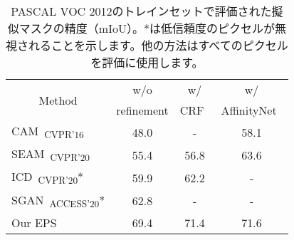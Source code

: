 \begin{table}[]
\centering
{\small
\begin{tabular}{@{}lccc@{}}
\toprule
\multicolumn{1}{c}{\multirow{2}{*}{Method}}         & w/o           & w/ &                                  w/ \\
                                                    & refinement    & CRF~\cite{krahenbuhl2011efficient}    & AffinityNet~\cite{ahn2018learning}    \\ \midrule
\multicolumn{1}{l}{CAM~\cite{zhou2016learning}\textsubscript{CVPR'16}}     & 48.0          & -                                     & 58.1                                  \\
\multicolumn{1}{l}{SEAM~\cite{wang2020self}\textsubscript{CVPR'20}}        & 55.4          & 56.8                                  & 63.6                                  \\
\multicolumn{1}{l}{ICD~\cite{chen2020boundary}\textsubscript{CVPR'20}*}     & 59.9          & 62.2                                  & -                                     \\
\multicolumn{1}{l}{SGAN~\cite{yao2020saliency}\textsubscript{ACCESS'20}*}     & 62.8          & -                                     & -                                     \\
\multicolumn{1}{l}{Our EPS}                            & 69.4          & 71.4                                  & 71.6                                  \\ \bottomrule
\end{tabular}
}
\vspace{2mm}
\caption{PASCAL VOC 2012のトレインセットで評価された擬似マスクの精度（mIoU）。*は低信頼度のピクセルが無視されることを示します。他の方法はすべてのピクセルを評価に使用します。} \vspace{-3mm}
\label{tab:refinement}
\end{table}

